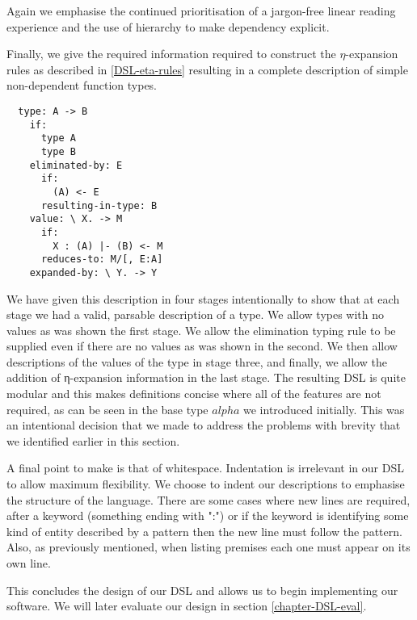 Again we emphasise the continued prioritisation of a jargon-free linear
reading experience and the use of hierarchy to make dependency explicit.

Finally, we give the required information required to construct the
$\eta$-expansion rules as described in \ref{DSL-eta-rules} resulting in
a complete description of simple non-dependent function types.

\begin{BVerbatim}
  type: A -> B
    if:
      type A
      type B
    eliminated-by: E
      if:
        (A) <- E
      resulting-in-type: B
    value: \ X. -> M
      if:
        X : (A) |- (B) <- M
      reduces-to: M/[, E:A]
    expanded-by: \ Y. -> Y
\end{BVerbatim}

We have given this description in four stages intentionally to show
that at each stage we had a valid, parsable description of a type. We
allow types with no values as was shown the first stage. We
allow the elimination typing rule to be supplied even if there are no
values as was shown in the second. We then allow descriptions of
the values of the type in stage three, and finally, we allow the
addition of η-expansion information in the last stage. The
resulting DSL is quite modular and this makes definitions
concise where all of the features are not required, as can be seen in
the base type $alpha$ we introduced initially. This was an intentional
decision that we made to address the problems with brevity that we
identified earlier in this section.

A final point to make is that of whitespace. Indentation is irrelevant
in our DSL to allow maximum flexibility. We choose to indent
our descriptions to emphasise the structure of the
language. There are some cases where new lines are required, after a
keyword (something ending with ":") or if the keyword is identifying
some kind of entity described by a pattern then the new line must
follow the pattern. Also, as previously mentioned, when listing
premises each one must appear on its own line.

This concludes the design of our DSL and allows us to begin
implementing our software. We will later evaluate our design in
section \ref{chapter-DSL-eval}.
